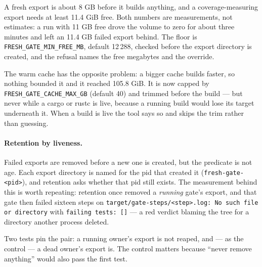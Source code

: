 A fresh export is about 8 GB before it builds anything, and a coverage-measuring export needs
at least 11.4 GiB free. Both numbers are measurements, not estimates: a run with 11 GB free
drove the volume to zero for about three minutes and left an 11.4 GB failed export behind. The
floor is \texttt{FRESH\_GATE\_MIN\_FREE\_MB}, default 12\,288, checked before the export
directory is created, and the refusal names the free megabytes and the override.

The warm cache has the opposite problem: a bigger cache builds faster, so nothing bounded it
and it reached 105.8 GiB. It is now capped by \texttt{FRESH\_GATE\_CACHE\_MAX\_GB} (default
40) and trimmed before the build --- but never while a cargo or rustc is live, because a
running build would lose its target underneath it. When a build is live the tool says so and
skips the trim rather than guessing.

\paragraph{Retention by liveness.} Failed exports are removed before a new one is created, but
the predicate is not age. Each export directory is named for the pid that created it
(\texttt{fresh-gate-<pid>}), and retention asks whether that pid still exists. The measurement
behind this is worth repeating: retention once removed a \emph{running} gate's export, and
that gate then failed sixteen steps on \texttt{target/gate-steps/<step>.log: No such file or
directory} with \texttt{failing tests: []} --- a red verdict blaming the tree for a directory
another process deleted.

Two tests pin the pair: a running owner's export is not reaped, and --- as the control --- a
dead owner's export is. The control matters because ``never remove anything'' would also pass
the first test.

\begin{center}
\end{center}


